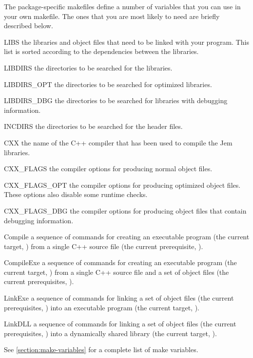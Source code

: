 \documentclass[a4paper,10pt]{article}
\begin{document}
The package-specific makefiles define a number of variables that you can
use in your own makefile. The ones that you are most likely to need are
briefly described below.
\begin{Description}[\Code]

\item[LIBS] the libraries and object files that need to be linked with
  your program. This list is sorted according to the dependencies between
  the libraries.

\item[LIBDIRS] the directories to be searched for the libraries.

\item[LIBDIRS_OPT] the directories to be searched for optimized
  libraries.

\item[LIBDIRS_DBG] the directories to be searched for libraries with
  debugging information.

\item[INCDIRS] the directories to be searched for the header files.

\item[CXX] the name of the C++ compiler that has been used to compile the
  Jem libraries.

\item[CXX_FLAGS] the compiler options for producing normal object
  files.

\item[CXX_FLAGS_OPT] the compiler options for producing optimized object
  files. These options also disable some runtime checks.

\item[CXX_FLAGS_DBG] the compiler options for producing object files that
  contain debugging information.

\item[Compile] a sequence of commands for creating an executable program
  (the current target, ) from a single C++ source file (the
  current prerequisite, \Code{\$<}).

\item[CompileExe] a sequence of commands for creating an executable
  program (the current target, ) from a single C++ source file
  and a set of object files (the current prerequisites, \Code{\$\^}).

\item[LinkExe] a sequence of commands for linking a set of object files
  (the current prerequisites, \Code{\$\^}) into an executable program
  (the current target, ).

\item[LinkDLL] a sequence of commands for linking a set of object files
  (the current prerequisites, \Code{\$\^}) into a dynamically shared
  library (the current target, ).

\end{Description}
See \autoref{section:make-variables} for a complete list of make
variables.
\end{document}
